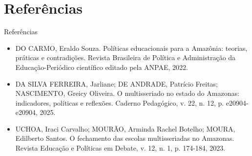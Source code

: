 \documentclass[12pt]{beamer}
\begin{document}
	\section{Referências}
	
		\begin{frame}{Referências}
			\begin{itemize}
				\small
				\item DO CARMO, Eraldo Souza. Políticas educacionais para a Amazônia: teorias, práticas e contradições. Revista Brasileira de Política e Administração da Educação-Periódico científico editado pela ANPAE, 2022.
				
				\item DA SILVA FERREIRA, Jarliane; DE ANDRADE, Patrício Freitas; NASCIMENTO, Greicy Oliveira. O multisseriado no estado do Amazonas: indicadores, políticas e reflexões. Caderno Pedagógico, v. 22, n. 12, p. e20904-e20904, 2025.
				
				\item UCHOA, Iraci Carvalho; MOURÃO, Arminda Rachel Botelho; MOURA, Edilberto Santos. O fechamento das escolas multisseriadas no Amazonas. Revista Educação e Políticas em Debate, v. 12, n. 1, p. 174-184, 2023.
			\end{itemize}
		\end{frame}
		


	
	
	
	
\end{document}
